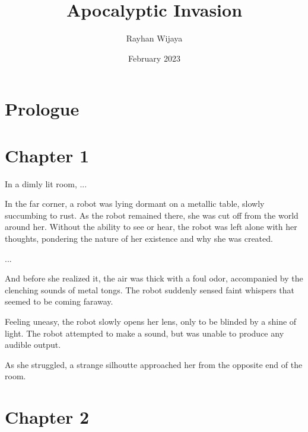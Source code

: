 \documentclass[12pt]{book}
\title{Apocalyptic Invasion}
\author{Rayhan Wijaya}
\date{February 2023}
\begin{document}
\maketitle

\section*{Prologue}

\section*{Chapter 1}

In a dimly lit room, ...

In the far corner, a robot was lying dormant on a metallic table, slowly
succumbing to rust. As the robot remained there, she was cut off from the world
around her. Without the ability to see or hear, the robot was left alone with
her thoughts, pondering the nature of her existence and why she was created.

...

And before she realized it, the air was thick with a foul odor, accompanied by
the clenching sounds of metal tongs. The robot suddenly sensed faint whispers
that seemed to be coming faraway.

Feeling uneasy, the robot slowly opens her lens, only to be blinded by a shine
of light. The robot attempted to make a sound, but was unable to produce any
audible output.

As she struggled, a strange silhoutte approached her from the opposite end of
the room.

\section*{Chapter 2}
\end{document}
